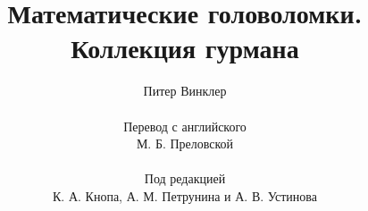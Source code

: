 \title{Математические головоломки.\\
Коллекция гурмана}
\author{Питер Винклер\\
\\
Перевод с английского
\\
М. Б. Преловской
\\
\\
Под редакцией
\\
К. А. Кнопа,
А. М. Петрунина и
А. В. Устинова
}
\date{}
\maketitle
